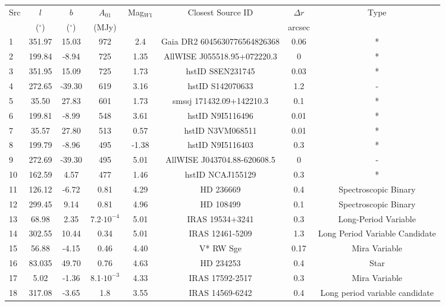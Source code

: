 \documentclass{aa}
\begin{document}
\begin{table}
    \centering
    \begin{tabular}{l c c c c c c c}
    \hline
    \hline
     Src & $l$ & $b$ & $A_{01}$ & Mag$_{W1}$ & Closest Source ID & $\Delta r$ & Type \\ 
     & ($^{\circ}$) & ($^{\circ}$) & (MJy) & & & arcsec &  \\
    
     \hline
     1 \rule{0pt}{2ex} & 351.97 & 15.03 & 972 & 2.4 & Gaia DR2 6045630776564826368 & 0.06 & * \\
     2 & 199.84 & -8.94 & 725 & 1.35 & AllWISE	J055518.95+072220.3 & 0 & * \\
	 3 & 351.95 & 15.09 & 725 & 1.73 & hstID S8EN231745 & 0.03 & * \\
     4 & 272.65 & -39.30 & 619 & 3.16 & hstID S142070633 & 1.2 & -\\
	 5 & 35.50 & 27.83 & 601 & 1.73 & smssj 171432.09+142210.3 & 0.1 & *\\ 
	 6 & 199.81 & -8.99 & 548 & 3.61 & hstID N9I5116496 & 0.01 & *\\ 
	 7 & 35.57 &  27.80 & 513 & 0.57 & hstID N3VM068511 & 0.01 & * \\
	 8 & 199.79 & -8.96 & 495 & -1.38 & hstID N9I5116403 & 0.3 & * \\ 
	 9 & 272.69 & -39.30 & 495 & 5.01 & AllWISE	J043704.88-620608.5  & 0 & -\\ 
	 10 & 162.59 & 4.57 & 477 & 1.46 & hstID NCAJ155129 & 0.3 & *\\ 
	 11 & 126.12 & -6.72 & 0.81 & 4.29 & HD 236669 & 0.4 & Spectroscopic Binary\\ 
	 12 & 299.45 & 9.14 & 0.81 & 4.96 & HD 108499 & 0.1 & Spectroscopic Binary\\ 
	 13 & 68.98 & 2.35 & 7.2$\cdot 10^{-4}$ & 5.01 & IRAS 19534+3241 & 0.3 & Long-Period Variable\\
	 14 & 302.55 &  10.44 & 0.34 & 5.01 & IRAS 12461-5209 & 1.3 & Long Period Variable Candidate\\
	 15 & 56.88 & -4.15 & 0.46 & 4.40 & V* RW Sge  & 0.17 & Mira Variable \\
	 16 & 83.035 & 49.70 & 0.76 & 4.63 & HD 234253 & 0.4 & Star\\
	 17 & 5.02 & -1.36 & 8.1$\cdot 10^{-3}$ & 4.33 & IRAS 17592-2517 & 0.3 & Mira Variable\\ 
	 18 & 317.08 & -3.65 & 1.8 & 3.55 & IRAS 14569-6242 & 0.4 & Long period variable candidate \\

\end{tabular}
\end{table}
\end{document}
